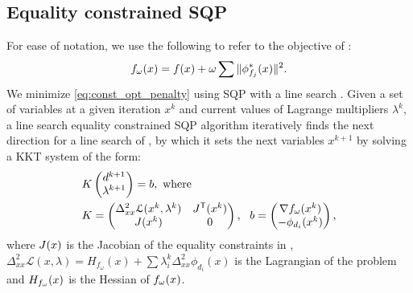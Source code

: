 \subsection{Equality constrained SQP} \label{sec:sqp_alg}
For ease of notation, we use the following to refer to the objective of :
\begin{equation}
f_\omega(x) = f(x) + \omega \sum \|\phi^*_{f_j}(x)\|^2.
\end{equation}
We minimize \eqref{eq:const_opt_penalty} using SQP with a line search \cite{nocedal}. Given a set of variables at a given iteration $x^k$ and current values of Lagrange multipliers $\lambda^k$, a line search equality constrained SQP algorithm iteratively finds the next direction for a line search of , by which it sets the next variables $x^{k+1}$ by solving a KKT system of the form:
%
\begin{equation} \label{eq:KKT_eps}
\begin{aligned}
&{K} \begin{pmatrix} d^{k+1} \\ \lambda^{k+1} \end{pmatrix}={b}, \ \text{where} \\
&{K}=\begin{pmatrix}
{\Delta^2_{xx}\mathcal{L}(x^k,\lambda^k)} & {J^\tr}(\x^k)\\
{J(\x^k)} &  0 \\
\end{pmatrix}, \ \ 
{b}=\begin{pmatrix}
{\nabla f_\omega(x^k)} \\ 
-\phi_{d_i}(x^k)\\
\end{pmatrix},
\end{aligned}
\end{equation}
%
where $J(x)$ is the Jacobian of the equality constraints in , $\Delta^2_{xx}\mathcal{L}(x,\lambda) = H_{f_\omega}(x)+\sum\lambda_i^{k} \Delta^2_{xx} \phi_{d_i}(x)$ is the  Lagrangian of the problem and $H_{f_\omega}(x)$ is the Hessian of $f_\omega(x)$.

